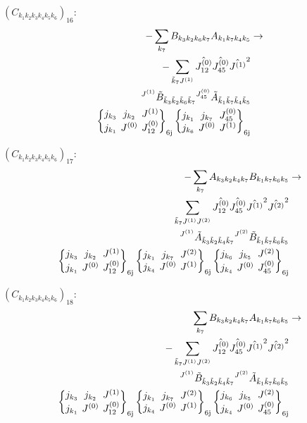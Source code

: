 \documentclass[11pt]{article}
\newcommand{\sixj}[6]{\begingroup\setlength{\arraycolsep}{0.2em}\begin{Bmatrix} #1 & #2 & #3 \\ #4 & #5 & #6 \end{Bmatrix}_{\text{6j}}\endgroup}
\begin{document}
$\left({C}_{{k}_{1}{k}_{2}{k}_{3}{k}_{4}{k}_{5}{k}_{6}}\right)_{16}$:
\begin{align}
-\sum_{{k}_{7}}{B}_{{k}_{3}{k}_{2}{k}_{6}{k}_{7}}{A}_{{k}_{1}{k}_{7}{k}_{4}{k}_{5}}&\rightarrow \notag \\-\sum_{\tilde{k}_{7}J^{(1)}}\hat{J^{(0)}_{12}}\hat{J^{(0)}_{45}}\hat{J^{(1)}}^{2}& \notag \\{}^{J^{(1)}}\tilde{B}_{\tilde{k}_{3}\tilde{k}_{2}\tilde{k}_{6}\tilde{k}_{7}}{}^{J^{(0)}_{45}}\tilde{A}_{\tilde{k}_{1}\tilde{k}_{7}\tilde{k}_{4}\tilde{k}_{5}}& \notag \\\sixj{j_{{k}_{3}}}{j_{{k}_{2}}}{J^{(1)}}{j_{{k}_{1}}}{J^{(0)}}{J^{(0)}_{12}}\sixj{j_{{k}_{1}}}{j_{{k}_{7}}}{J^{(0)}_{45}}{j_{{k}_{6}}}{J^{(0)}}{J^{(1)}}
\end{align}

$\left({C}_{{k}_{1}{k}_{2}{k}_{3}{k}_{4}{k}_{5}{k}_{6}}\right)_{17}$:
\begin{align}
-\sum_{{k}_{7}}{A}_{{k}_{3}{k}_{2}{k}_{4}{k}_{7}}{B}_{{k}_{1}{k}_{7}{k}_{6}{k}_{5}}&\rightarrow \notag \\\sum_{\tilde{k}_{7}J^{(1)}J^{(2)}}\hat{J^{(0)}_{12}}\hat{J^{(0)}_{45}}\hat{J^{(1)}}^{2}\hat{J^{(2)}}^{2}& \notag \\{}^{J^{(1)}}\tilde{A}_{\tilde{k}_{3}\tilde{k}_{2}\tilde{k}_{4}\tilde{k}_{7}}{}^{J^{(2)}}\tilde{B}_{\tilde{k}_{1}\tilde{k}_{7}\tilde{k}_{6}\tilde{k}_{5}}& \notag \\\sixj{j_{{k}_{3}}}{j_{{k}_{2}}}{J^{(1)}}{j_{{k}_{1}}}{J^{(0)}}{J^{(0)}_{12}}\sixj{j_{{k}_{1}}}{j_{{k}_{7}}}{J^{(2)}}{j_{{k}_{4}}}{J^{(0)}}{J^{(1)}}\sixj{j_{{k}_{6}}}{j_{{k}_{5}}}{J^{(2)}}{j_{{k}_{4}}}{J^{(0)}}{J^{(0)}_{45}}
\end{align}

$\left({C}_{{k}_{1}{k}_{2}{k}_{3}{k}_{4}{k}_{5}{k}_{6}}\right)_{18}$:
\begin{align}
\sum_{{k}_{7}}{B}_{{k}_{3}{k}_{2}{k}_{4}{k}_{7}}{A}_{{k}_{1}{k}_{7}{k}_{6}{k}_{5}}&\rightarrow \notag \\-\sum_{\tilde{k}_{7}J^{(1)}J^{(2)}}\hat{J^{(0)}_{12}}\hat{J^{(0)}_{45}}\hat{J^{(1)}}^{2}\hat{J^{(2)}}^{2}& \notag \\{}^{J^{(1)}}\tilde{B}_{\tilde{k}_{3}\tilde{k}_{2}\tilde{k}_{4}\tilde{k}_{7}}{}^{J^{(2)}}\tilde{A}_{\tilde{k}_{1}\tilde{k}_{7}\tilde{k}_{6}\tilde{k}_{5}}& \notag \\\sixj{j_{{k}_{3}}}{j_{{k}_{2}}}{J^{(1)}}{j_{{k}_{1}}}{J^{(0)}}{J^{(0)}_{12}}\sixj{j_{{k}_{1}}}{j_{{k}_{7}}}{J^{(2)}}{j_{{k}_{4}}}{J^{(0)}}{J^{(1)}}\sixj{j_{{k}_{6}}}{j_{{k}_{5}}}{J^{(2)}}{j_{{k}_{4}}}{J^{(0)}}{J^{(0)}_{45}}
\end{align}
\end{document}
